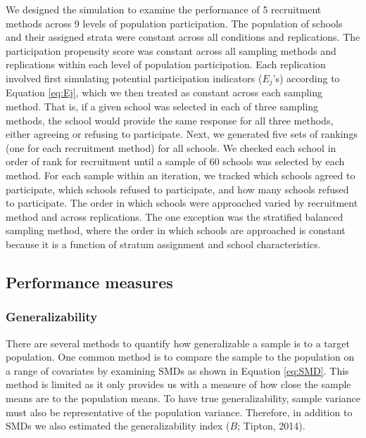 \documentclass[
  english,
  man,floatsintext]{apa6}
\begin{document}
We designed the simulation to examine the performance of 5 recruitment methods across 9 levels of population participation. The population of schools and their assigned strata were constant across all conditions and replications. The participation propensity score was constant across all sampling methods and replications within each level of population participation. Each replication involved first simulating potential participation indicators (\(E_j\)'s) according to Equation \eqref{eq:Ej}, which we then treated as constant across each sampling method. That is, if a given school was selected in each of three sampling methods, the school would provide the same response for all three methods, either agreeing or refusing to participate. Next, we generated five sets of rankings (one for each recruitment method) for all schools.
We checked each school in order of rank for recruitment until a sample of 60 schools was selected by each method. For each sample within an iteration, we tracked which schools agreed to participate, which schools refused to participate, and how many schools refused to participate.
The order in which schools were approached varied by recruitment method and across replications. The one exception was the stratified balanced sampling method, where the order in which schools are approached is constant because it is a function of stratum assignment and school characteristics.

\hypertarget{performance-measures}{%
\subsection{Performance measures}\label{performance-measures}}

\hypertarget{generalizability}{%
\subsubsection{Generalizability}\label{generalizability}}

There are several methods to quantify how generalizable a sample is to a target population. One common method is to compare the sample to the population on a range of covariates by examining SMDs as shown in Equation \eqref{eq:SMD}. This method is limited as it only provides us with a measure of how close the sample means are to the population means. To have true generalizability, sample variance must also be representative of the population variance. Therefore, in addition to SMDs we also estimated the generalizability index (\(B\); Tipton, 2014).
\end{document}

